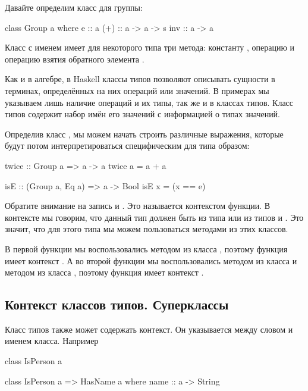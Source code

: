 Давайте определим класс для группы:

\begin{code}
class Group a where
    e   :: a
    (+) :: a -> a -> s
    inv :: a -> a
\end{code}

Класс с именем  имеет для некоторого типа  
три метода: константу , операцию 
и операцию взятия обратного элемента .

Как и в алгебре, в Haskell классы типов позволяют описывать 
сущности в терминах, определённых на них операций или значений.
В примерах мы указываем лишь наличие операций и их типы, так же
и в классах типов. Класс типов содержит набор имён его значений 
с информацией о типах значений.

Определив класс , мы можем начать строить 
различные выражения, которые будут потом интерпретироваться
специфическим для типа образом:

\begin{code}
twice :: Group a => a -> a
twice a = a + a

isE :: (Group a, Eq a) => a -> Bool
isE x = (x == e)
\end{code}

Обратите внимание на запись  и 
. Это называется контекстом функции. 
В контексте мы говорим, что данный тип должен быть из 
типа  или из типов  и . Это
значит, что для этого типа мы можем пользоваться методами
из этих классов.

В первой функции  мы воспользовались методом
\In{(+)} из класса , поэтому функция имеет
контекст . А во второй функции  
мы воспользовались методом  из класса  и
методом \In{(==)} из класса , поэтому функция
имеет контекст .

\subsection{Контекст классов типов. Суперклассы}

Класс типов также может содержать контекст. Он указывается
между словом  и именем класса. Например


\begin{code}
class IsPerson a

class IsPerson a => HasName a where
    name :: a -> String
\end{code}

